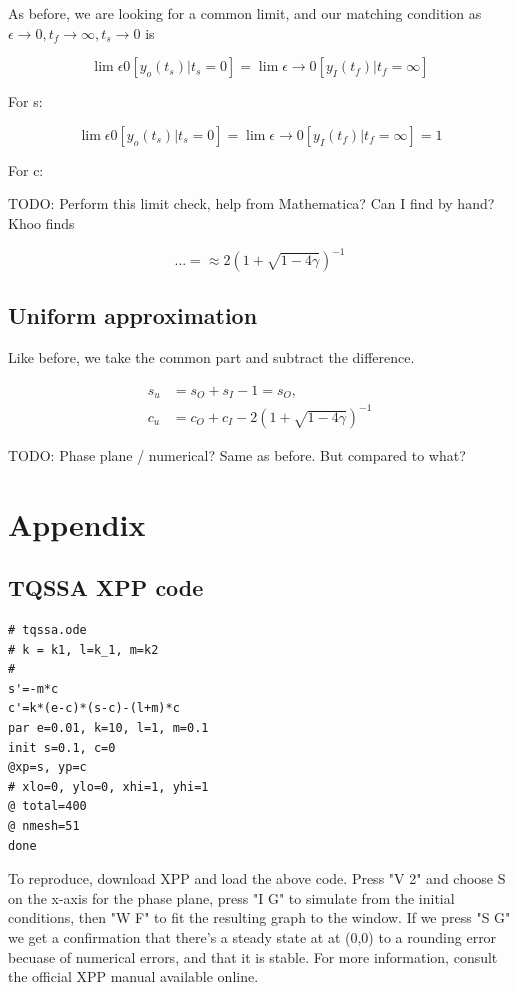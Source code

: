 \documentclass[12pt]{article}
\begin{document}
As before, we are looking for a common limit, and our matching condition as
$\epsilon \to 0, t_f \to \infty, t_s \to 0$ is

\begin{equation}
\lim \epsilon 0 [y_o(t_s)|t_s=0] = \lim \epsilon \to 0[y_I(t_f)|t_f=\infty]
\end{equation}

For s:

\begin{equation}
\lim \epsilon 0 [y_o(t_s)|t_s=0] = \lim \epsilon \to 0[y_I(t_f)|t_f=\infty] = 1
\end{equation}

For c:

TODO: Perform this limit check, help from Mathematica? Can I find by hand? Khoo
finds

\begin{equation}
... = \approx 2(1+\sqrt{1-4\gamma})^{-1}
\end{equation}

\subsection{Uniform approximation}

Like before, we take the common part and subtract the difference.

\begin{align}
s_u &= s_O + s_I - 1 = s_O, \\
c_u &= c_O + c_I - 2(1 + \sqrt{1-4\gamma})^{-1}
\end{align}

TODO: Phase plane / numerical? Same as before. But compared to what?

\section{Appendix}

\subsection{TQSSA XPP code}

\begin{verbatim}
# tqssa.ode
# k = k1, l=k_1, m=k2
#
s'=-m*c
c'=k*(e-c)*(s-c)-(l+m)*c
par e=0.01, k=10, l=1, m=0.1
init s=0.1, c=0
@xp=s, yp=c
# xlo=0, ylo=0, xhi=1, yhi=1
@ total=400
@ nmesh=51
done
\end{verbatim}

To reproduce, download XPP and load the above code. Press "V 2" and
choose S on the x-axis for the phase plane, press "I G" to simulate
from the initial conditions, then "W F" to fit the resulting graph to
the window. If we press "S G" we get a confirmation that there's a
steady state at at (0,0) to a rounding error becuase of numerical
errors, and that it is stable. For more information, consult the
official XPP manual available online.


\end{document}
